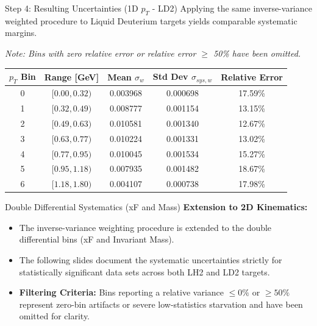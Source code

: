 \documentclass[aspectratio=169]{beamer}
\begin{document}
\begin{frame}{Step 4: Resulting Uncertainties (1D $p_T$ - LD2)}
    Applying the same inverse-variance weighted procedure to Liquid Deuterium targets yields comparable systematic margins.
    
    \textit{Note: Bins with zero relative error or relative error $\geq$ 50\% have been omitted.}
    \vspace{0.3cm}
    
    \begin{table}[]
        \centering
        \begin{tabular}{@{}ccccc@{}}
        \toprule
        \textbf{$p_T$ Bin} & \textbf{Range [GeV]} & \textbf{Mean $\sigma_w$} & \textbf{Std Dev $\sigma_{sys,w}$} & \textbf{Relative Error} \\ \midrule
        0 & $[0.00, 0.32)$ & 0.003968 & 0.000698 & 17.59\% \\
        1 & $[0.32, 0.49)$ & 0.008777 & 0.001154 & 13.15\% \\
        2 & $[0.49, 0.63)$ & 0.010581 & 0.001340 & 12.67\% \\
        3 & $[0.63, 0.77)$ & 0.010224 & 0.001331 & 13.02\% \\
        4 & $[0.77, 0.95)$ & 0.010045 & 0.001534 & 15.27\% \\
        5 & $[0.95, 1.18)$ & 0.007935 & 0.001482 & 18.67\% \\
        6 & $[1.18, 1.80)$ & 0.004107 & 0.000738 & 17.98\% \\
        \bottomrule
        \end{tabular}
    \end{table}
\end{frame}

\begin{frame}{Double Differential Systematics (xF and Mass)}
    \textbf{Extension to 2D Kinematics:}
    \vspace{0.3cm}
    \begin{itemize}
        \item The inverse-variance weighting procedure is extended to the double differential bins (xF and Invariant Mass).
        \item The following slides document the systematic uncertainties strictly for statistically significant data sets across both LH2 and LD2 targets.
        \item \textbf{Filtering Criteria:} Bins reporting a relative variance $\leq 0\%$ or $\geq 50\%$ represent zero-bin artifacts or severe low-statistics starvation and have been omitted for clarity.
    \end{itemize}
\end{frame}
\end{document}
